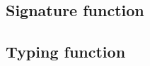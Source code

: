 \documentclass[a4paper,USenglish]{tex/lipics-v2016}
\begin{document}
\subsection{Signature function}

\begin{mathpar}



\end{mathpar}

\subsection{Typing function}

\begin{mathpar}
\end{mathpar}





\end{document}
